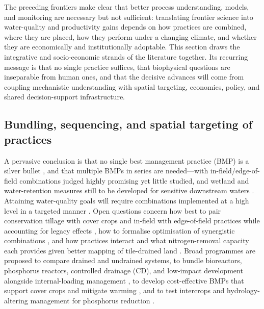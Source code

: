 The preceding frontiers make clear that better process understanding, models,
and monitoring are necessary but not sufficient: translating frontier science
into water-quality and productivity gains depends on how practices are
combined, where they are placed, how they perform under a changing climate, and
whether they are economically and institutionally adoptable. This section draws
the integrative and socio-economic strands of the literature together. Its
recurring message is that no single practice suffices, that biophysical
questions are inseparable from human ones, and that the decisive advances will
come from coupling mechanistic understanding with spatial targeting, economics,
policy, and shared decision-support infrastructure.

\subsection{Bundling, sequencing, and spatial targeting of practices}

A pervasive conclusion is that no single best management practice (BMP) is a
silver bullet \parencite{Sunohara2016}, and that multiple BMPs in series are
needed---with in-field/edge-of-field combinations judged highly promising yet
little studied, and wetland and water-retention measures still to be developed
for sensitive downstream waters \parencite{Lenhart2016}. Attaining water-quality
goals will require combinations implemented at a high level in a targeted manner
\parencite{Christianson2014}. Open questions concern how best to pair
conservation tillage with cover crops and in-field with edge-of-field practices
while accounting for legacy effects \parencite{Makhtoumi2025}, how to formalise
optimisation of synergistic combinations \parencite{Kreig2019}, and how
practices interact and what nitrogen-removal capacity each provides given better
mapping of tile-drained land \parencite{McLellan2015}. Broad programmes are
proposed to compare drained and undrained systems, to bundle bioreactors,
phosphorus reactors, controlled drainage (CD), and low-impact development
alongside internal-loading management \parencite{Baulch2019,Husk2024,Husk2017},
to develop cost-effective BMPs that support cover crops and mitigate warming
\parencite{Gupta2023}, and to test intercrops and hydrology-altering management
for phosphorus reduction \parencite{HernandezRamirez2011,GAYNOR1995b}.

